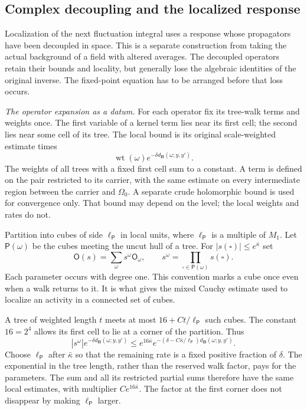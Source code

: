 \documentclass[11pt,letterpaper,reqno]{amsart}
\theoremstyle{definition}
\theoremstyle{remark}
\begin{document}
\subsection{Complex decoupling and the localized response}

Localization of the next fluctuation integral uses a response
whose propagators have been decoupled in space. This is a
separate construction from taking the actual background of a
field with altered averages. The decoupled operators retain
their bounds and locality, but generally lose the algebraic
identities of the original inverse. The fixed-point equation
has to be arranged before that loss occurs.

\emph{The operator expansion as a datum.}
For each operator fix its tree-walk terms and weights once.
The first variable of a kernel term lies near its first cell;
the second lies near some cell of its tree. The local bound
is its original scale-weighted estimate times
\[
 \operatorname{wt}(\omega)
                   e^{-\delta d_{\mathbf B}(\omega;y,y')}.
\]
The weights of all trees with a fixed first cell sum to a
constant. A term is defined on the pair restricted to its
carrier, with the same estimate on every intermediate region
between the carrier and $\Omega_0$. A separate crude
holomorphic bound is used for convergence only. That bound
may depend on the level; the local weights and rates do not.

Partition into cubes of side $\ell_{\mathsf P}$ in local
units, where $\ell_{\mathsf P}$ is a multiple of $M_1$.
Let $\mathsf P(\omega)$ be the cubes meeting the uncut
hull of a tree. For $|s(\square)|\le e^{\bar\kappa}$ set
\[
 \mathsf O(s)=\sum_\omega s^\omega\mathsf O_\omega,
 \qquad s^\omega=\prod_{\square\in\mathsf P(\omega)}s(\square).
\]
Each parameter occurs with degree one. This convention
marks a cube once even when a walk returns to it. It is
what gives the mixed Cauchy estimate used to localize an
activity in a connected set of cubes.

A tree of weighted length $t$ meets at most
$16+Ct/\ell_{\mathsf P}$ such cubes. The constant
$16=2^4$ allows its first cell to lie at a corner of the
partition. Thus
\[
 |s^\omega|e^{-\delta d_{\mathbf B}(\omega;y,y')}
 \le e^{16\bar\kappa}
       e^{-(\delta-C\bar\kappa/\ell_{\mathsf P})
                                    d_{\mathbf B}(\omega;y,y')}.
\]
Choose $\ell_{\mathsf P}$ after $\bar\kappa$ so that
the remaining rate is a fixed positive fraction of
$\delta$. The exponential in the tree length, rather
than the reserved walk factor, pays for the parameters.
The sum and all its restricted partial sums therefore
have the same local estimates, with multiplier
$Ce^{16\bar\kappa}$. The factor at the first corner
does not disappear by making $\ell_{\mathsf P}$ larger.
\end{document}
